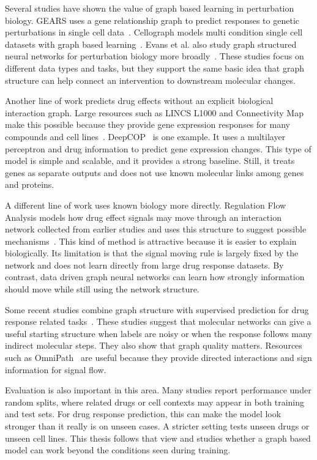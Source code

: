 \noindent Several studies have shown the value of graph based learning in perturbation biology. GEARS uses a gene relationship graph to predict responses to genetic perturbations in single cell data~\cite{roohani2023gears}. Cellograph models multi condition single cell datasets with graph based learning~\cite{shahir2024cellograph}. Evans et al. also study graph structured neural networks for perturbation biology more broadly~\cite{evans2024gsnn}. These studies focus on different data types and tasks, but they support the same basic idea that graph structure can help connect an intervention to downstream molecular changes.

\noindent Another line of work predicts drug effects without an explicit biological interaction graph. Large resources such as LINCS L1000 and Connectivity Map make this possible because they provide gene expression responses for many compounds and cell lines~\cite{l1000_paper}. DeepCOP~\cite{woo2020deepcop} is one example. It uses a multilayer perceptron and drug information to predict gene expression changes. This type of model is simple and scalable, and it provides a strong baseline. Still, it treats genes as separate outputs and does not use known molecular links among genes and proteins.

\noindent A different line of work uses known biology more directly. Regulation Flow Analysis models how drug effect signals may move through an interaction network collected from earlier studies and uses this structure to suggest possible mechanisms~\cite{roca2025rfa}. This kind of method is attractive because it is easier to explain biologically. Its limitation is that the signal moving rule is largely fixed by the network and does not learn directly from large drug response datasets. By contrast, data driven graph neural networks can learn how strongly information should move while still using the network structure.

\noindent Some recent studies combine graph structure with supervised prediction for drug response related tasks~\cite{wang2022graphgrp, kim2021gcn_drug_response}. These studies suggest that molecular networks can give a useful starting structure when labels are noisy or when the response follows many indirect molecular steps. They also show that graph quality matters. Resources such as OmniPath~\cite{turei2016omnipath} are useful because they provide directed interactions and sign information for signal flow.

\noindent Evaluation is also important in this area. Many studies report performance under random splits, where related drugs or cell contexts may appear in both training and test sets. For drug response prediction, this can make the model look stronger than it really is on unseen cases. A stricter setting tests unseen drugs or unseen cell lines. This thesis follows that view and studies whether a graph based model can work beyond the conditions seen during training.


